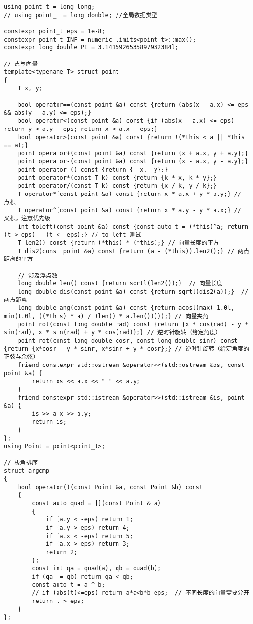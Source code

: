 \documentclass[a4paper,10pt]{article}
\begin{document}
\noindent\begin{lstlisting}
using point_t = long long;
// using point_t = long double; //全局数据类型

constexpr point_t eps = 1e-8;
constexpr point_t INF = numeric_limits<point_t>::max();
constexpr long double PI = 3.1415926535897932384l;

// 点与向量
template<typename T> struct point
{
    T x, y;

    bool operator==(const point &a) const {return (abs(x - a.x) <= eps && abs(y - a.y) <= eps);}
    bool operator<(const point &a) const {if (abs(x - a.x) <= eps) return y < a.y - eps; return x < a.x - eps;}
    bool operator>(const point &a) const {return !(*this < a || *this == a);}
    point operator+(const point &a) const {return {x + a.x, y + a.y};}
    point operator-(const point &a) const {return {x - a.x, y - a.y};}
    point operator-() const {return { -x, -y};}
    point operator*(const T k) const {return {k * x, k * y};}
    point operator/(const T k) const {return {x / k, y / k};}
    T operator*(const point &a) const {return x * a.x + y * a.y;} // 点积
    T operator^(const point &a) const {return x * a.y - y * a.x;} // 叉积，注意优先级
    int toleft(const point &a) const {const auto t = (*this)^a; return (t > eps) - (t < -eps);} // to-left 测试
    T len2() const {return (*this) * (*this);} // 向量长度的平方
    T dis2(const point &a) const {return (a - (*this)).len2();} // 两点距离的平方

    // 涉及浮点数
    long double len() const {return sqrtl(len2());}  // 向量长度
    long double dis(const point &a) const {return sqrtl(dis2(a));}  // 两点距离
    long double ang(const point &a) const {return acosl(max(-1.0l, min(1.0l, ((*this) * a) / (len() * a.len()))));} // 向量夹角
    point rot(const long double rad) const {return {x * cos(rad) - y * sin(rad), x * sin(rad) + y * cos(rad)};} // 逆时针旋转（给定角度）
    point rot(const long double cosr, const long double sinr) const {return {x*cosr - y * sinr, x*sinr + y * cosr};} // 逆时针旋转（给定角度的正弦与余弦）
    friend constexpr std::ostream &operator<<(std::ostream &os, const point &a) {
        return os << a.x << " " << a.y;
    }
    friend constexpr std::istream &operator>>(std::istream &is, point &a) {
        is >> a.x >> a.y;
        return is;
    }
};
using Point = point<point_t>;

// 极角排序
struct argcmp
{
    bool operator()(const Point &a, const Point &b) const
    {
        const auto quad = [](const Point & a)
        {
            if (a.y < -eps) return 1;
            if (a.y > eps) return 4;
            if (a.x < -eps) return 5;
            if (a.x > eps) return 3;
            return 2;
        };
        const int qa = quad(a), qb = quad(b);
        if (qa != qb) return qa < qb;
        const auto t = a ^ b;
        // if (abs(t)<=eps) return a*a<b*b-eps;  // 不同长度的向量需要分开
        return t > eps;
    }
};


\end{lstlisting}
\end{document}
